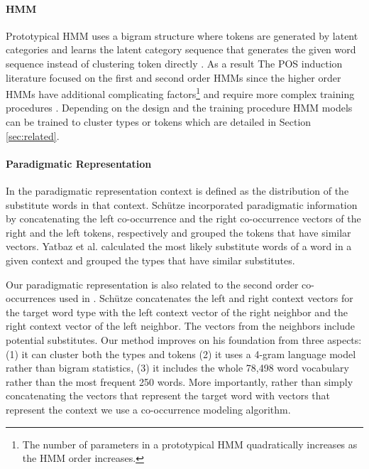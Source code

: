 \paragraph{HMM} 
Prototypical HMM uses a bigram structure where tokens are generated by
latent categories and learns the latent category sequence that
generates the given word sequence instead of clustering token directly
\cite{Brown:1992:CNG:176313.176316,blunsom-cohn:2011:ACL-HLT2011,goldwater-griffiths:2007:ACLMain,johnson:2007:EMNLP-CoNLL2007,Ganchev:2010:PRS:1859890.1859918,bergkirkpatrick-klein:2010:ACL,Lee:2010:STU:1870658.1870741}.
As a result The POS induction literature focused on the first and
second order HMMs since the higher order HMMs have additional
complicating factors\footnote{The number of parameters in a
  prototypical HMM quadratically increases as the HMM order
  increases.}  and require more complex training procedures
\cite{johnson:2007:EMNLP-CoNLL2007}.  Depending on the design and the
training procedure HMM models can be trained to cluster types or
tokens which are detailed in Section \ref{sec:related}.

\paragraph{Paradigmatic Representation} 

In the paradigmatic representation context is defined as the
distribution of the substitute words in that context.  Sch\"{u}tze
 incorporated paradigmatic
information by concatenating the left co-occurrence and the right
co-occurrence vectors of the right and the left tokens, respectively
and grouped the tokens that have similar vectors.  Yatbaz et
al.  calculated the most
likely substitute words of a word in a given context and grouped the
types that have similar substitutes.

Our paradigmatic representation is also related to the second order
co-occurrences used in \cite{Schutze:1995:DPT:976973.976994}.
Sch{\"u}tze concatenates the left and right context vectors for the
target word type with the left context vector of the right neighbor
and the right context vector of the left neighbor.  The vectors from
the neighbors include potential substitutes.  Our method improves on
his foundation from three aspects: (1) it can cluster both the types
and tokens (2) it uses a 4-gram language model rather than bigram
statistics, (3) it includes the whole 78,498 word vocabulary rather
than the most frequent 250 words.  More importantly, rather than
simply concatenating the vectors that represent the target word with
vectors that represent the context we use a co-occurrence modeling
algorithm.

